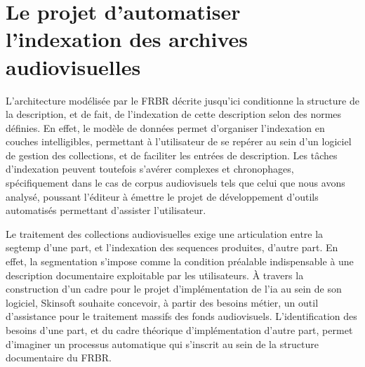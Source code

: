 \chapter{\label{I_3}Le projet d'automatiser l'indexation des archives audiovisuelles}



L'architecture modélisée par le \gls{FRBR} décrite jusqu'ici conditionne la structure de la description, et de fait, de l'indexation de cette description selon des normes définies. En effet, le modèle de données permet d'organiser l'indexation en couches intelligibles, permettant à l'utilisateur de se repérer au sein d'un logiciel de gestion des collections, et de faciliter les entrées de description. Les tâches d'indexation peuvent toutefois s’avérer complexes et chronophages, spécifiquement dans le cas de corpus audiovisuels tels que celui que nous avons analysé, poussant l'éditeur à émettre le projet de développement d'outils automatisés permettant d'assister l'utilisateur.



  





Le traitement des collections audiovisuelles exige une articulation entre la \gls{segtemp} d'une part, et l'indexation des \gls{sequence}s produites, d'autre part. En effet, la segmentation s'impose comme la condition préalable indispensable à une description documentaire exploitable par les utilisateurs. À travers la construction d'un cadre pour le projet d'implémentation de l'\gls{ia} au sein de son logiciel, Skinsoft souhaite concevoir, à partir des besoins métier, un outil d'assistance pour le traitement massifs des fonds audiovisuels. L'identification des besoins d'une part, et du cadre théorique d'implémentation d'autre part, permet d'imaginer un processus automatique qui s'inscrit au sein de la structure documentaire du \gls{FRBR}. 

\clearpage
